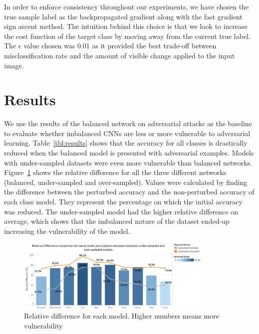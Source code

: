 \documentclass[runningheads,a4paper]{llncs}
\begin{document}
In order to enforce consistency throughout our experiments, we have chosen the true sample label as the backpropagated gradient along with the fast gradient sign ascent method. The intuition behind this choice is that we look to increase the cost function of the target class by moving away from the current true label. The $\epsilon$ value chosen was 0.01 as it provided the best trade-off between misclassification rate and the amount of visible change applied to the input image.


\section{Results}
We use the results of the balanced network on adversarial attacks as the baseline to evaluate whether imbalanced CNNs are less or more vulnerable to adversarial learning. Table~\ref{tbl:results} shows that the accuracy for all classes is drastically reduced when the balanced model is presented with adversarial examples. Models with under-sampled datasets were even more vulnerable than balanced networks. Figure~\ref{fig:relative_difference} shows the relative difference for all the three different networks (balanced, under-sampled and over-sampled). Values were calculated by finding the difference between the perturbed accuracy and the non-perturbed accuracy of each class model. They represent the percentage on which the initial accuracy was reduced. The under-sampled model had the higher relative difference on average, which shows that the imbalanced nature of the dataset ended-up increasing the vulnerability of the model.

\begin{figure}
	\centering
	\includegraphics[height=3.5cm]{rel_diff_graph.png}
	\caption{Relative difference for each model. Higher numbers means more vulnerability}
	\label{fig:relative_difference}
\end{figure}
\end{document}
